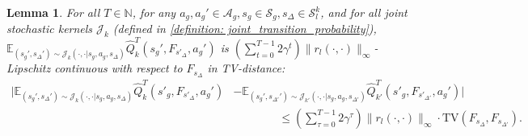 \documentclass{article}
\theoremstyle{plain}
\newtheorem{lemma}[theorem]{Lemma}
\theoremstyle{definition}
\def\E{\mathbb{E}}
\def\N{\mathbb{N}}
\begin{document}
\begin{lemma}{\label{lemma: expectation Q lipschitz continuous wrt Fsdelta}For all $T\in\N$, for any $a_g, a_g'\in\mathcal{A}_g,s_g\in\mathcal{S}_g, s_\Delta\in\mathcal{S}_l^{k}$, and for all joint stochastic kernels $\mathcal{J}_k$ (defined in \cref{definition: joint_transition_probability}), $\E_{(s_g',s_\Delta')\sim\mathcal{J}_k(\cdot,\cdot|s_g,a_g,s_\Delta)} \hat{Q}_k^T(s_g', F_{s'_\Delta}, a_g')$ is $(\sum_{t=0}^{T-1} 2\gamma^t)\|r_l(\cdot,\cdot)\|_\infty$-Lipschitz continuous with respect to $F_{s_\Delta}$ in TV-distance:}
\begin{align*}|\E_{(s_g',s_\Delta')\sim\mathcal{J}_k(\cdot,\cdot|s_g,a_g,s_\Delta)}\hat{Q}_k^T(s'_g,F_{s'_\Delta},a_g') &- \E_{(s_g',s_{\Delta'}')\sim\mathcal{J}_{k'}(\cdot,\cdot|s_g,a_g,s_{\Delta'})}\hat{Q}_{k'}^T(s'_g, F_{s'_{\Delta'}}, a_g')| \\
&\quad\quad\quad\quad \leq \left(\sum_{\tau=0}^{T-1}2\gamma^\tau\right)\|r_l(\cdot,\cdot)\|_\infty\cdot\mathrm{TV}\left(F_{s_\Delta}, F_{s_{\Delta'}}\right).
\end{align*}
\end{lemma}
\end{document}

